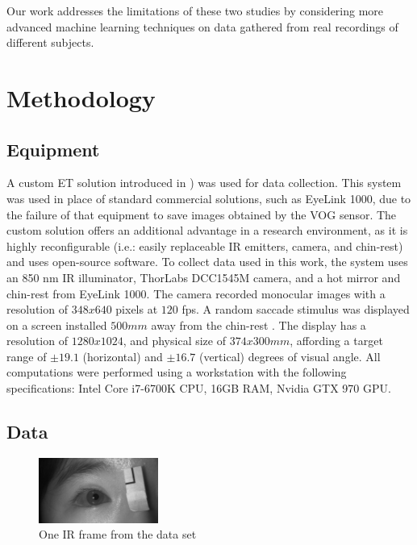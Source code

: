 Our work addresses the limitations of these two studies by considering more advanced machine learning techniques on data gathered from real recordings of different subjects.

\section{Methodology}

\subsection{Equipment}

A custom ET solution introduced in \cite{abdulin2017study})  was used for data collection. This system was used in place of standard commercial solutions, such as EyeLink 1000, due to the failure of that equipment to save images obtained by the VOG sensor. The custom solution  offers an additional advantage in a research environment, as it is highly reconfigurable (i.e.: easily replaceable IR emitters, camera, and chin-rest) and uses open-source software. To collect data used in this work, the system uses an 850 nm IR illuminator, ThorLabs DCC1545M camera,  and a hot mirror and chin-rest from EyeLink 1000. The camera recorded monocular images with a resolution of $348x640$ pixels at $120$ fps. 
A random saccade stimulus was displayed on a screen installed $500mm$ away from the chin-rest . The display has a resolution of $1280x1024$,  and physical size of $374x300 mm$, affording a target range of $\pm 19.1$\textdegree{} (horizontal)  and $\pm 16.7$\textdegree{} (vertical) degrees of visual angle. All computations were performed using a workstation with the following specifications: Intel Core i7-6700K CPU, 16GB RAM, Nvidia GTX 970 GPU.

\subsection{Data}

\begin{figure}[h]
\begin{center}
\includegraphics[width=0.35\textwidth]{data_frame.jpg}
\end{center}
   \caption{One IR frame from the data set}
\label{fig:data_frame}
\end{figure}

